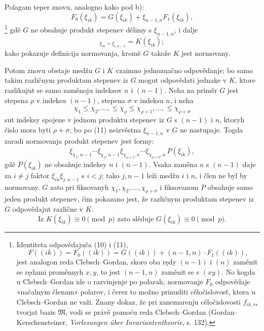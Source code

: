 \documentclass[11pt]{article}
\providecommand{\frM}{\mathfrak M}
\begin{document}
Polagam teper znovu, analogno kako pod b):
\begin{equation}
        F_0(\xi_{ik})=G(\xi_{ik})+\xi_{n-1,n}F_1(\xi_{ik}),
\end{equation}
\footnote{Identiteta odpovědajuča (10) i (11),
        \[
          F((ik))=F_0((ik))=G((ik))+(n-1,n)\cdot F_1((ik)),
        \]
        jest analogon reda Clebsch--Gordan, skoro oba rędy \((n-1)\) i \((n)\) zaměnit se rędami proměnnyh \(x,y\), to jest \((n-1,n)\) zaměnit se s \((xy)\). No kogda u Clebsch--Gordan ide o razvinjenje po polarah, normovanje \(F_0\) odpovědaje «načalnym členam» polarov, i čerez to možno prinuditi cěločislovosť, ktora u Clebsch--Gordan ne važi. Znany dokaz, že pri zanemarenju cěločislovosti \(f_{ik,rs}\) tvorjat bazis \(\frM\), vodi se právě pomoću reda Clebsch--Gordan (Gordan--Kerschensteiner, \emph{Vorlesungen über Invariantentheorie}, s. 132).}
gdě \(G\) ne obsahuje produkt stepenev dělimy s \(\xi_{n-1,n}\), i dalje
\begin{equation}
        [G]_{\xi_{in}=\xi_{i,n-1}}=K(\xi_{ik});
\end{equation}
kako pokazuje definicija normovanja, kromě \(G\) takože \(K\) jest normovany.

Potom znovu obstaje medžu \(G\) i \(K\) vzaimno jednoznačno odpovědanje; bo samo takim različnym produktam stepenev iz \(G\) mogut odpovědati jednake v \(K\), ktore razlikujut se samo zaměnoju indeksov \(n\) i \((n-1)\). Neha na priměr \(G\) jest stepena \(\rho\) v indeksu \((n-1)\), stepena \(\sigma\) v indeksu \(n\), i neha
\[
        \chi_1\le\chi_2,\ldots,\le\chi_\rho\le\chi_{\rho+1},\ldots,\le\chi_{\rho+\sigma}
\]
sut indeksy spojene v jednom produktu stepenev iz \(G\) s \((n-1)\) i \(n\), ktoryh čislo mora byti \(\rho+\sigma\), bo po (11) neizvěstna \(\xi_{n-1,n}\) v \(G\) ne nastupaje. Togda zaradi normovanja produkt stepenev jest formy:
\[
        \xi_{\chi_1,n-1}\cdots\xi_{\chi_\rho,n-1}
        \xi_{\chi_{\rho+1},n}\cdots\xi_{\chi_{\rho+\sigma},n}\,P(\xi_{ik}),
\]
gdě \(P(\xi_{ik})\) ne obsahuje indeksy \(n\) i \((n-1)\). Vsaka zaměna \(n\) s \((n-1)\) daje za \(i\ne j\) faktor \(\xi_{in}\xi_{j,n-1}\) s \(i<j\); tako \(j,n-1\) leži medžu \(i\) i \(n\), i člen ne byl by normovany. \(G\) zato pri fiksovanyh \(\chi_1,\chi_2,\ldots,\chi_{\rho+\sigma}\) i fiksovanom \(P\) obsahuje samo jeden produkt stepenev, čim pokazano jest, že različnym produktam stepenev iz \(G\) odpovědajut različne v \(K\).
\begin{equation}
        \text{Iz }K(\xi_{ik})\equiv0\pmod p\text{ zato slěduje }G(\xi_{ik})\equiv0\pmod p.
\end{equation}
\end{document}
